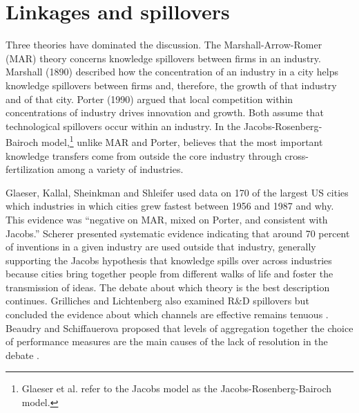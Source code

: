 \section{Linkages and spillovers}
Three theories have dominated the discussion. The Marshall-Arrow-Romer (MAR) theory concerns knowledge spillovers between firms in an industry.  Marshall (1890) described how the concentration of an industry in a city helps knowledge
spillovers between firms and, therefore, the growth of that industry and of that city. Porter (1990) argued that local competition within concentrations of industry drives innovation and growth. Both assume that technological spillovers occur within an industry. In the Jacobs-Rosenberg\cite{rosenbergTechnologicalChangeMachine1963}-Bairoch \cite{bairochCitiesEconomicDevelopment1988} model,\footnote{Glaeser et al. \cite{glaeserGrowthCities1991} refer to the Jacobs model as the Jacobs-Rosenberg\cite{rosenbergTechnologicalChangeMachine1963}-Bairoch \cite{bairochCitiesEconomicDevelopment1988} model. } unlike MAR and Porter, believes that the most important knowledge transfers come from outside the core industry through cross-fertilization among a variety  of  industries. 


Glaeser, Kallal, Sheinkman and Shleifer \cite{glaeserGrowthCities1991} used data on 170 of the largest US cities which industries in which cities grew fastest between 1956 and 1987 and why. %
This evidence was ``negative on MAR, mixed on Porter, and consistent with Jacobs.'' Scherer \cite{schererInterindustryTechnologyFlows1982} presented systematic evidence indicating that around 70 percent of inventions in a given industry are used outside that industry, generally supporting the Jacobs hypothesis that knowledge spills over across industries because cities bring together people from different walks of life and foster the transmission of ideas. The debate about which theory is the best description  continues. Grilliches and Lichtenberg also examined R\&D spillovers but concluded the evidence about which channels are effective remains tenuous \cite{grilichesInterindustryTechnologyFlows1984}. Beaudry and Schiffauerova proposed that levels of  aggregation together the choice of performance measures are the main causes of the lack of resolution in the debate  \cite{beaudryWhoRightMarshall2009}.


